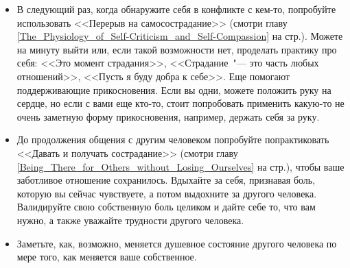 \begin{itemize}
	\item В следующий раз, когда обнаружите себя в конфликте с кем-то, попробуйте использовать <<Перерыв на самосострадание>> (смотри главу \ref{The_Physiology_of_Self-Criticism_and_Self-Compassion} на стр.\:\pageref{IP:Self-Compassion_Break}). Можете на минуту выйти или, если такой возможности нет, проделать практику про себя: <<Это момент страдания>>, <<Страдание~"--- это часть любых отношений>>, <<Пусть я буду добра к себе>>. Еще помогают поддерживающие прикосновения. Если вы одни, можете положить руку на сердце, но если с вами еще кто-то, стоит попробовать применить какую-то не очень заметную форму прикосновения, например, держать себя за руку.
	
	\item До продолжения общения с другим человеком попробуйте попрактиковать <<Давать и получать сострадание>> (смотри главу \ref{Being_There_for_Others_without_Losing_Ourselves} на стр.\:\pageref{M:Giving_and_Receiving_Compassion}), чтобы ваше заботливое отношение сохранилось. Вдыхайте за себя, признавая боль, которую вы сейчас чувствуете, а потом выдохните за другого человека.  Валидируйте свою собственную боль целиком и дайте себе то, что вам нужно, а также уважайте трудности другого человека.
	
	\item Заметьте, как, возможно, меняется душевное состояние другого человека по мере того, как меняется ваше собственное. 
\end{itemize}


\newpage
{} \label{Ex:Fulfilling_Our_Emotional_Needs}

